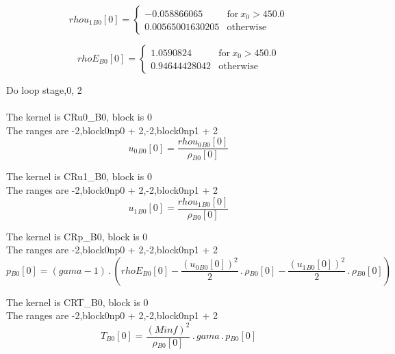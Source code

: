 \documentclass{article}
\begin{document}
\begin{dmath}{rhou_{1}{_{B0}}}[{0}] = \begin{cases} -0.058866065 & \text{for}\: x_{0} > 450.0 \\0.00565001630205 & \text{otherwise} \end{cases}\end{dmath}

\begin{dmath}{rhoE{_{B0}}}[{0}] = \begin{cases} 1.0590824 & \text{for}\: x_{0} > 450.0 \\0.94644428042 & \text{otherwise} \end{cases}\end{dmath}

\noindent Do loop stage,0, 2\\
\\\noindent The kernel is CRu0_B0, block is 0\\\noindent The ranges are -2,block0np0 + 2,-2,block0np1 + 2\\\begin{dmath}{u_{0}{_{B0}}}[{0}] = \frac{{rhou_{0}{_{B0}}}[{0}]}{{\rho{_{B0}}}[{0}]}\end{dmath}

\noindent The kernel is CRu1_B0, block is 0\\\noindent The ranges are -2,block0np0 + 2,-2,block0np1 + 2\\\begin{dmath}{u_{1}{_{B0}}}[{0}] = \frac{{rhou_{1}{_{B0}}}[{0}]}{{\rho{_{B0}}}[{0}]}\end{dmath}

\noindent The kernel is CRp_B0, block is 0\\\noindent The ranges are -2,block0np0 + 2,-2,block0np1 + 2\\\begin{dmath}{p{_{B0}}}[{0}] = \left(gama - 1\right) \,.\, \left({rhoE{_{B0}}}[{0}] - \frac{\left({u_{0}{_{B0}}}[{0}] \right)^{2}}{2} \,.\, {\rho{_{B0}}}[{0}] - \frac{\left({u_{1}{_{B0}}}[{0}] \right)^{2}}{2} \,.\, 
{\rho{_{B0}}}[{0}]\right)\end{dmath}

\noindent The kernel is CRT_B0, block is 0\\\noindent The ranges are -2,block0np0 + 2,-2,block0np1 + 2\\\begin{dmath}{T{_{B0}}}[{0}] = \frac{\left(Minf \right)^{2}}{{\rho{_{B0}}}[{0}]} \,.\, gama \,.\, {p{_{B0}}}[{0}]\end{dmath}
\end{document}
